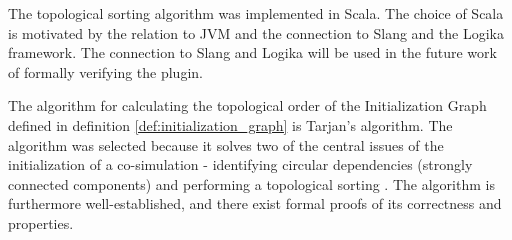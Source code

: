 \documentclass[runningheads]{llncs}
\begin{document}
The topological sorting algorithm was implemented in Scala. The choice of Scala is motivated by the relation to JVM and the connection to Slang and the Logika framework\cite{inbook}. The connection to Slang and Logika will be used in the future work of formally verifying the plugin.

The algorithm for calculating the topological order of the Initialization Graph defined in definition \ref{def:initialization_graph} is Tarjan's algorithm. The algorithm was selected because it solves two of the central issues of the initialization of a co-simulation - identifying circular dependencies (strongly connected components) and performing a topological sorting \cite{tarjan_1972}. The algorithm is furthermore well-established, and there exist formal proofs of its correctness and properties\cite{stefan_merz}. 



%



\end{document}

